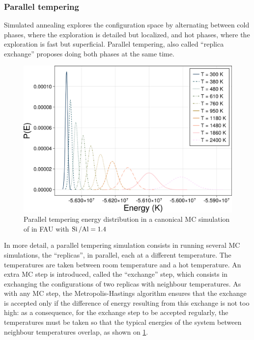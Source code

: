 \documentclass[main.tex]{subfiles}
\begin{document}

\subsubsection{Parallel tempering}

\label{paralleltempering}

Simulated annealing explores the configuration space by alternating between cold phases, where the exploration is detailed but localized, and hot phases, where the exploration is fast but superficial. Parallel tempering, also called ``replica exchange'' proposes doing both phases at the same time.

\begin{figure}
	\centering
	\includegraphics[width=\linewidth]{figures/cations/paralleltempering.pdf}
	\caption{Parallel tempering energy distribution in a canonical MC simulation of  in FAU with $\mbox{Si\,/Al} = \num{1.4}$}\label{fig:paralleltempering}
\end{figure}

In more detail, a parallel tempering simulation consists in running several MC simulations, the ``replicas'', in parallel, each at a different temperature. The temperatures are taken between room temperature and a hot temperature. An extra MC step is introduced, called the ``exchange'' step, which consists in exchanging the configurations of two replicas with neighbour temperatures. As with any MC step, the Metropolis-Hastings algorithm ensures that the exchange is accepted only if the difference of energy resulting from this exchange is not too high: as a consequence, for the exchange step to be accepted regularly, the temperatures must be taken so that the typical energies of the system between neighbour temperatures overlap, as shown on \cref{fig:paralleltempering}.
\end{document}
